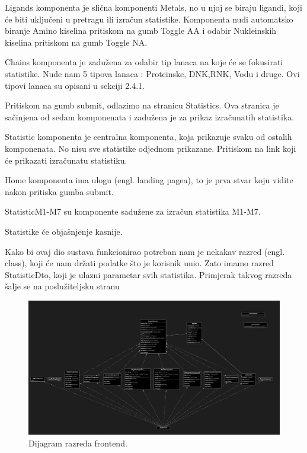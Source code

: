 \documentclass[times, utf8, zavrsni]{fer}
\begin{document}
Ligands komponenta je slična komponenti Metals, no u njoj se biraju ligandi, koji će biti uključeni u pretragu ili izračun statistike. Komponenta nudi automatsko biranje
Amino kiselina pritiskom na gumb Toggle AA i odabir Nukleinskih kiselina pritiskom na gumb Toggle NA.

Chains komponenta je zadužena za odabir tip lanaca na koje će se fokusirati statistike. Nude nam 5 tipova lanaca : Proteinske, DNK,RNK, Vodu i druge.
Ovi tipovi lanaca su opisani u sekciji 2.4.1.

Pritiskom na gumb submit, odlazimo na stranicu Statistics.
Ova stranica je sačinjena od sedam  komponenata i zadužena je za prikaz izračunatih statistika.

Statistic komponenta je centralna komponenta, koja prikazuje svaku od ostalih komponenata. No nisu sve statistike odjednom prikazane. Pritiskom na link koji će prikazati izračunatu statistiku. 

Home komponenta  ima ulogu (engl. landing pagea), to je prva stvar koju vidite nakon pritiska gumba submit.

StatisticM1-M7 su komponente sadužene za izračun statistika M1-M7.

Statistike će objašnjenje kasnije.

Kako bi ovaj dio sustava funkcionirao potreban nam je nekakav razred (engl. class), koji će nam držati podatke što je korisnik unio. Zato imamo razred
StatisticDto, koji je ulazni parametar svih statistika. Primjerak takvog razreda šalje se na poslužiteljsku stranu 

  \begin{figure}[!htb]
	\centering
	\hspace*{-2.5cm}
	 \includegraphics[width=22cm,height=\paperheight,keepaspectratio,angle=90]
	{./img/frontend.png}
		\centering
                      \caption{Dijagram razreda frontend.}
    \end{figure}
\end{document}
